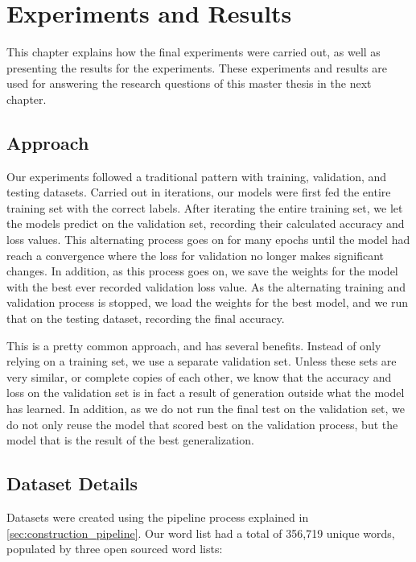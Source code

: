 
\chapter{Experiments and Results}
\label{ch:experiments_and_results}
This chapter explains how the final experiments were carried out, as well as presenting the results for the experiments. These experiments and results are used for answering the research questions of this master thesis in the next chapter.


\section{Approach}
Our experiments followed a traditional pattern with training, validation, and testing datasets. Carried out in iterations, our models were first fed the entire training set with the correct labels. After iterating the entire training set, we let the models predict on the validation set, recording their calculated accuracy and loss values. This alternating process goes on for many epochs until the model had reach a convergence where the loss for validation no longer makes significant changes. In addition, as this process goes on, we save the weights for the model with the best ever recorded validation loss value. As the alternating training and validation process is stopped, we load the weights for the best model, and we run that on the testing dataset, recording the final accuracy.

This is a pretty common approach, and has several benefits. Instead of only relying on a training set, we use a separate validation set. Unless these sets are very similar, or complete copies of each other, we know that the accuracy and loss on the validation set is in fact a result of generation outside what the model has learned. In addition, as we do not run the final test on the validation set, we do not only reuse the model that scored best on the validation process, but the model that is the result of the best generalization.


\section{Dataset Details}
Datasets were created using the pipeline process explained in \ref{sec:construction_pipeline}. Our word list had a total of 356,719 unique words, populated by three open sourced word lists:

